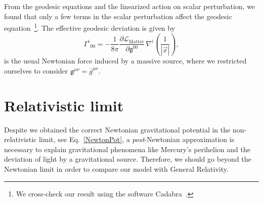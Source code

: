 \documentclass[aps,prd,12pt,twocolumn,superscriptaddress,showpacs,showkeys,reprint%
]{revtex4-1}
\renewcommand{\(}{\left(}
\renewcommand{\)}{\right)}
\renewcommand{\[}{\left[}
\renewcommand{\]}{\right]}
\begin{document}
From the geodesic equations and the linearized action on scalar perturbation, we found that only a few terms in the scalar perturbation affect the geodesic equation~\footnote{We cross-check our result using the software Cadabra~\cite{Peeters2007550,peeters2007symbolic,Peeters:2007wn}.}. The effective geodesic deviation is given by
\begin{equation}
  \label{NewtonPot}
  \Gamma^i{}_{00} = - \frac{1}{8\pi} \frac{ \partial\mathcal{L}_{\text{Matter}} }{ \partial \mathfrak{g}^{00} } \, \nabla^i \left(\frac{1}{|\vec{x}|}\right),
\end{equation}
is the usual Newtonian force induced by a massive source, where we restricted ourselves to consider $\mathfrak{g}^{\mu \nu} = \bar{g}^{\mu\nu}$.


\section{\label{rlimit}Relativistic limit}
Despite we obtained the correct Newtonian gravitational potential in the non-relativistic limit, see Eq.~\eqref{NewtonPot}, a \emph{post}-Newtonian approximation is necessary to explain gravitational phenomena like Mercury's perihelion and the deviation of light by a gravitational source. Therefore, we should go beyond the Newtonian limit in order to compare our model with General Relativity.
\end{document}
